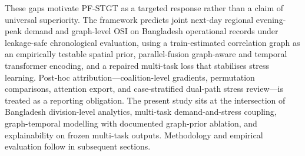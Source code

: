 These gaps motivate PF-STGT as a targeted response rather than a claim of universal superiority. The framework predicts joint next-day regional evening-peak demand and graph-level OSI on Bangladesh operational records under leakage-safe chronological evaluation, using a train-estimated correlation graph as an empirically testable spatial prior, parallel-fusion graph-aware and temporal transformer encoding, and a repaired multi-task loss that stabilises stress learning. Post-hoc attribution---coalition-level gradients, permutation comparisons, attention export, and case-stratified dual-path stress review---is treated as a reporting obligation. The present study sits at the intersection of Bangladesh division-level analytics, multi-task demand-and-stress coupling, graph-temporal modelling with documented graph-prior ablation, and explainability on frozen multi-task outputs. Methodology and empirical evaluation follow in subsequent sections.
